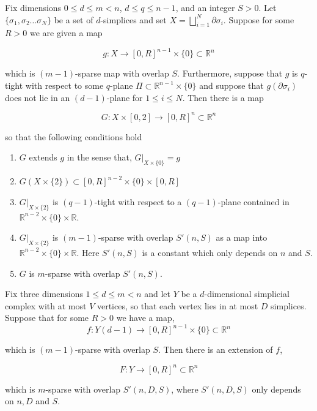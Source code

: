 \documentclass[10pt,a4paper]{amsart}
\newcommand{\RR}{\mathbb{R}}
\begin{document}
	\begin{lemma} \label{tight} Fix  dimensions $0 \le d \le m < n$, $d \le q \le n-1$, and an integer $S > 0$. Let $\{\sigma_1, \sigma_2 \ldots \sigma_N\}$ be a set of $d$-simplices and set $X = \bigsqcup_{i=1}^N \partial \sigma_i$. Suppose for some $R > 0$ we are given a map
		
		$$g: X \to [0,R]^{n-1} \times \{0\} \subset \RR^n$$
		
		\noindent which is $(m-1)$-sparse map with overlap $S$. Furthermore, suppose that $g$ is $q$-tight with respect to some $q$-plane $\Pi \subset \RR^{n-1} \times \{0\}$ and suppose that $g(\partial \sigma_i)$ does not lie in an $(d-1)$-plane for $1 \le i \le N$. Then there is a map
		
		$$G: X \times [0,2] \to  [0, R]^{n} \subset \RR^n$$
		
		\noindent so that the following conditions hold
		
		\begin{enumerate}
			\item $G$ extends $g$ in the sense that, $G|_{X \times \{0\}} = g$
			\item $G(X \times \{2\}) \subset [0,R]^{n-2} \times \{0\} \times [0,R]$
			\item $G|_{X \times \{2\}}$ is $(q-1)$-tight with respect to a $(q-1)$-plane contained in $\RR^{n-2} \times \{0\} \times \RR$.
			\item $G|_{X \times \{2\}}$ is $(m-1)$-sparse with overlap $S'(n,S)$ as a map into $\RR^{n-2} \times \{0\} \times \RR$. Here $S'(n,S)$ is a constant which only depends on $n$ and $S$.
			\item $G$ is $m$-sparse with overlap $S'(n,S)$.
		\end{enumerate} 
		
	\end{lemma}

	\begin{lemma} \label{extension} Fix three dimensions $1 \le d \le m < n$ and let $Y$ be a $d$-dimensional simplicial complex with at most $V$ vertices, so that each vertex lies in at most $D$ simplices. Suppose that for some $R>0$ we have a map,
		$$f: Y(d-1) \to [0, R]^{n-1} \times \{0\} \subset \RR^{n}$$
		
		\noindent which is $(m-1)$-sparse with overlap $S$. Then there is an extension of $f$,
		
		$$F: Y \to [0, R]^n  \subset \RR^{n}$$
		
		\noindent which is $m$-sparse with overlap $S'(n,D,S)$, where $S'(n,D,S)$ only depends on $n, D$ and $S$.
	\end{lemma}
\end{document}

